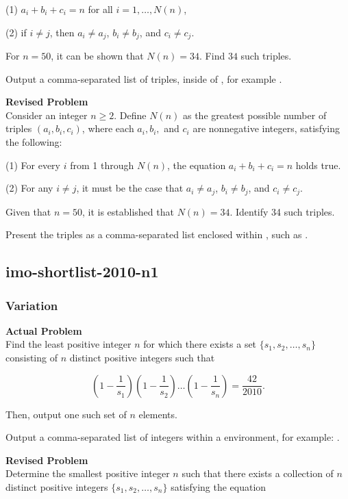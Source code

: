 (1) $a_i+b_i+c_i=n$ for all $i=1,\ldots,N(n)$,

(2) if $i \neq j$, then $a_i \neq a_j$, $b_i \neq b_j$, and $c_i \neq c_j$.

For $n = 50$, it can be shown that $N(n)=34$. Find $34$ such triples.


Output a comma-separated list of triples, inside of \boxed, for example .

\textbf{Revised Problem}\\
Consider an integer \( n \geq 2 \). Define \( N(n) \) as the greatest possible number of triples \((a_i, b_i, c_i)\), where each \( a_i, b_i, \) and \( c_i \) are nonnegative integers, satisfying the following:

(1) For every \( i \) from 1 through \( N(n) \), the equation \( a_i + b_i + c_i = n \) holds true.

(2) For any \( i \neq j \), it must be the case that \( a_i \neq a_j \), \( b_i \neq b_j \), and \( c_i \neq c_j \).

Given that \( n = 50 \), it is established that \( N(n) = 34 \). Identify 34 such triples.

Present the triples as a comma-separated list enclosed within \boxed{}, such as .

\subsection{imo-shortlist-2010-n1}
\subsubsection{Variation}
\textbf{Actual Problem}\\
Find the least positive integer $n$ for which there exists a set $\{s_1, s_2, \ldots, s_n\}$ consisting of $n$ distinct positive integers such that

$$
\left(1 - \frac{1}{s_1}\right) \left(1 - \frac{1}{s_2}\right) \ldots \left(1 - \frac{1}{s_n}\right) = \frac{42}{2010}.
$$

Then, output one such set of $n$ elements.


Output a comma-separated list of integers within a \boxed environment, for example: .

\textbf{Revised Problem}\\
Determine the smallest positive integer \( n \) such that there exists a collection of \( n \) distinct positive integers \(\{s_1, s_2, \ldots, s_n\}\) satisfying the equation

